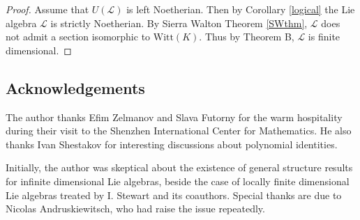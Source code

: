 \documentclass[11pt, letterpaper, reqno]{amsart}
\theoremstyle{definition}
\newcommand{\cL}{\mathcal L}
\newcommand{\Witt}{\mathrm{Witt}}
\begin{document}
\begin{proof} Assume that $U(\cL)$ is left Noetherian.
Then by Corollary \ref{logical}  the Lie algebra 
$\cL$ is strictly  Noetherian. 
By Sierra Walton Theorem \ref{SWthm}, $\cL$ does not admit a section
isomorphic to $\Witt(K)$. Thus by Theorem B,
$\cL$ is finite dimensional.
\end{proof}





\subsection*{Acknowledgements} 
The author  thanks Efim Zelmanov and Slava Futorny 
for the warm hospitality during their visit  to the 
Shenzhen International Center for Mathematics.
He also thanks Ivan Shestakov for interesting discussions
about polynomial identities. 

Initially, the author was skeptical about the existence of general structure results for  infinite dimensional Lie algebras,
beside the case of locally finite dimensional Lie algebras
treated by I. Stewart and its coauthors.  Special thanks are due to Nicolas Andruskiewitsch, who 
had raise the issue repeatedly.
\end{document}
